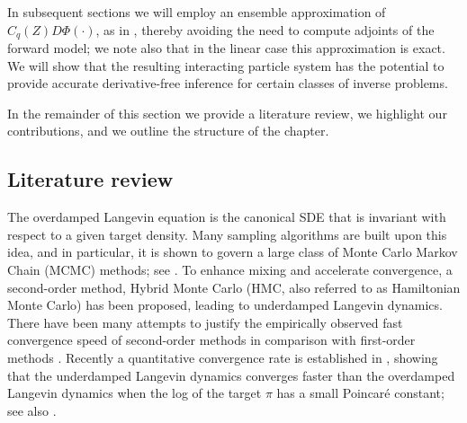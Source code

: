 \documentclass[12pt]{caltech_thesis}
\newtheorem{theorem}{Theorem}[section]
\numberwithin{equation}{section}
\begin{document}
{In subsequent sections we will 
employ an ensemble approximation of $C_q(Z)D \Phi(\cdot)$, as in \cite{garbuno2020interacting}, thereby
avoiding the need to compute adjoints of the forward model; we note also that in the linear case this approximation is exact. We will show that the resulting interacting
particle system has the potential to provide accurate derivative-free inference
for {certain classes of} inverse problems.} 


{In the remainder of this section we provide a literature review, we
highlight our contributions, and we outline the structure of the chapter.}
 
 






\subsection{Literature review}
\label{ssec:lit}
The overdamped Langevin equation is the canonical SDE that is invariant with respect to {a given target density}. Many sampling algorithms are built upon this idea, and in particular, it is shown to govern a large class of Monte Carlo Markov Chain (MCMC) methods; see \cite{roberts2001optimal,ottobre2011asymptotic,ma2015complete}.
To enhance mixing and accelerate convergence, a second-order method, Hybrid Monte Carlo (HMC, also referred to as Hamiltonian Monte Carlo) \cite{duane1987hybrid,neal1994improved} has been proposed, leading
to underdamped Langevin dynamics. There have been many attempts to justify the empirically
observed fast convergence speed of second-order methods in comparison with first-order methods \cite{betancourt2017conceptual}. Recently a quantitative convergence rate is established in \cite{cao2019explicit}, showing that the underdamped Langevin dynamics converges faster than the overdamped Langevin dynamics when the log of the target $\pi$ has a small Poincar\'e constant; see also \cite{eberle2019couplings}. 
\end{document}
